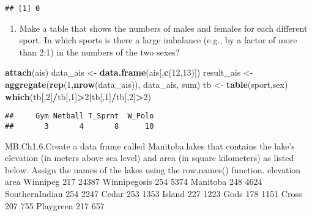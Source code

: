 \documentclass[hyperref,]{ctexart}
\newenvironment{Shaded}{\begin{snugshade}}{\end{snugshade}}
\newcommand{\DecValTok}[1]{\textcolor[rgb]{0.00,0.00,0.81}{#1}}
\newcommand{\KeywordTok}[1]{\textcolor[rgb]{0.13,0.29,0.53}{\textbf{#1}}}
\newcommand{\NormalTok}[1]{#1}
\newcommand{\OperatorTok}[1]{\textcolor[rgb]{0.81,0.36,0.00}{\textbf{#1}}}
\newcommand{\StringTok}[1]{\textcolor[rgb]{0.31,0.60,0.02}{#1}}
\providecommand{\tightlist}{%
  \setlength{\itemsep}{0pt}\setlength{\parskip}{0pt}}
\begin{document}
\begin{verbatim}
## [1] 0
\end{verbatim}

\begin{enumerate}
\def\labelenumi{(\alph{enumi})}
\setcounter{enumi}{1}
\tightlist
\item
  Make a table that shows the numbers of males and females for each
  different sport. In which sports is there a large imbalance (e.g., by
  a factor of more than 2:1) in the numbers of the two sexes?
\end{enumerate}

\begin{Shaded}
\begin{Highlighting}[]
\KeywordTok{attach}\NormalTok{(ais)}
\NormalTok{data_ais <-}\StringTok{ }\KeywordTok{data.frame}\NormalTok{(ais[,}\KeywordTok{c}\NormalTok{(}\DecValTok{12}\NormalTok{,}\DecValTok{13}\NormalTok{)])}
\NormalTok{result_ais <-}\StringTok{ }\KeywordTok{aggregate}\NormalTok{(}\KeywordTok{rep}\NormalTok{(}\DecValTok{1}\NormalTok{,}\KeywordTok{nrow}\NormalTok{(data_ais)), data_ais, sum)}
\NormalTok{tb <-}\StringTok{ }\KeywordTok{table}\NormalTok{(sport,sex)}
\KeywordTok{which}\NormalTok{(tb[,}\DecValTok{2}\NormalTok{]}\OperatorTok{/}\NormalTok{tb[,}\DecValTok{1}\NormalTok{]}\OperatorTok{>}\DecValTok{2}\OperatorTok{|}\NormalTok{tb[,}\DecValTok{1}\NormalTok{]}\OperatorTok{/}\NormalTok{tb[,}\DecValTok{2}\NormalTok{]}\OperatorTok{>}\DecValTok{2}\NormalTok{)}
\end{Highlighting}
\end{Shaded}

\begin{verbatim}
##     Gym Netball T_Sprnt  W_Polo 
##       3       4       8      10
\end{verbatim}

MB.Ch1.6.Create a data frame called Manitoba.lakes that contains the
lake's elevation (in meters above sea level) and area (in square
kilometers) as listed below. Assign the names of the lakes using the
row.names() function. elevation area Winnipeg 217 24387 Winnipegosis 254
5374 Manitoba 248 4624 SouthernIndian 254 2247 Cedar 253 1353 Island 227
1223 Gods 178 1151 Cross 207 755 Playgreen 217 657
\end{document}
